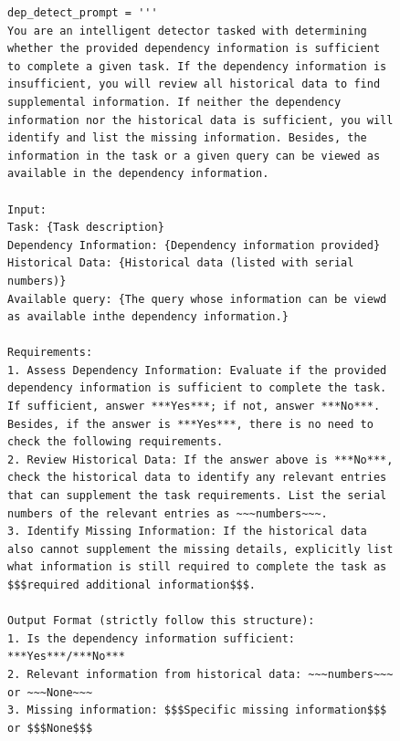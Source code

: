\begin{figure}
\centering
\begin{lstlisting}[frame=single, basicstyle=\scriptsize\ttfamily, breaklines=true]
dep_detect_prompt = '''
You are an intelligent detector tasked with determining whether the provided dependency information is sufficient to complete a given task. If the dependency information is insufficient, you will review all historical data to find supplemental information. If neither the dependency information nor the historical data is sufficient, you will identify and list the missing information. Besides, the information in the task or a given query can be viewed as available in the dependency information.

Input:
Task: {Task description}
Dependency Information: {Dependency information provided}
Historical Data: {Historical data (listed with serial numbers)}
Available query: {The query whose information can be viewd as available inthe dependency information.}

Requirements:
1. Assess Dependency Information: Evaluate if the provided dependency information is sufficient to complete the task. If sufficient, answer ***Yes***; if not, answer ***No***. Besides, if the answer is ***Yes***, there is no need to check the following requirements.
2. Review Historical Data: If the answer above is ***No***, check the historical data to identify any relevant entries that can supplement the task requirements. List the serial numbers of the relevant entries as ~~~numbers~~~.
3. Identify Missing Information: If the historical data also cannot supplement the missing details, explicitly list what information is still required to complete the task as $$$required additional information$$$.

Output Format (strictly follow this structure):
1. Is the dependency information sufficient: ***Yes***/***No***
2. Relevant information from historical data: ~~~numbers~~~ or ~~~None~~~
3. Missing information: $$$Specific missing information$$$ or $$$None$$$


\end{lstlisting}
\end{figure}
